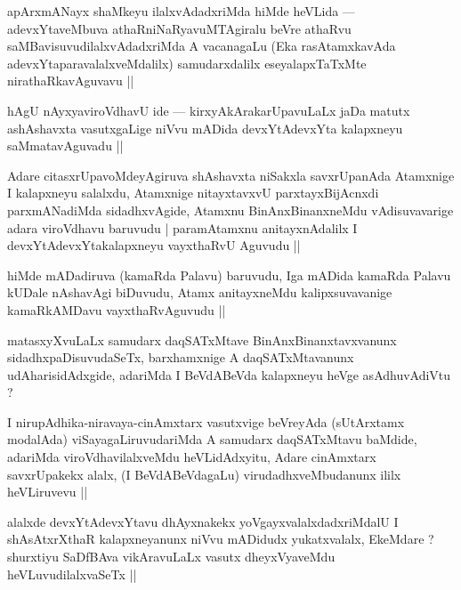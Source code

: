 
\begin{artha}
apArxmANayx shaMkeyu ilalxvAdadxriMda hiMde heVLida --- adevxYtaveMbuva athaRniNaRyavuMTAgiralu beVre athaRvu saMBavisuvudilalxvAdadxriMda A vacanagaLu (Eka rasAtamxkavAda adevxYtaparavalalxveMdalilx) samudarxdalilx eseyalapxTaTxMte nirathaRkavAguvavu ||
\end{artha}

\begin{artha}
hAgU nAyxyaviroVdhavU ide --- kirxyAkArakarUpavuLaLx jaDa matutx ashAshavxta vasutxgaLige niVvu mADida devxYtAdevxYta kalapxneyu saMmatavAguvadu ||
\end{artha}

\begin{artha}
Adare citasxrUpavoMdeyAgiruva shAshavxta niSakxla savxrUpanAda Atamxnige I kalapxneyu salalxdu, Atamxnige nitayxtavxvU parxtayxBijAcnxdi parxmANadiMda sidadhxvAgide, Atamxnu BinAnxBinanxneMdu vAdisuvavarige adara viroVdhavu baruvudu | paramAtamxnu anitayxnAdalilx I devxYtAdevxYtakalapxneyu vayxthaRvU Aguvudu ||
\end{artha}


\begin{artha}
hiMde mADadiruva (kamaRda Palavu) baruvudu, Iga mADida kamaRda Palavu kUDale nAshavAgi biDuvudu, Atamx anitayxneMdu kalipxsuvavanige kamaRkAMDavu vayxthaRvAguvudu ||
\end{artha}


\begin{artha}
matasxyXvuLaLx samudarx daqSATxMtave BinAnxBinanxtavxvanunx sidadhxpaDisuvudaSeTx, barxhamxnige A daqSATxMtavanunx udAharisidAdxgide, adariMda I BeVdABeVda kalapxneyu heVge asAdhuvAdiVtu ?
\end{artha}


\begin{artha}
I nirupAdhika-niravaya-cinAmxtarx vasutxvige beVreyAda (sUtArxtamx modalAda) viSayagaLiruvudariMda A samudarx daqSATxMtavu baMdide, adariMda viroVdhavilalxveMdu heVLidAdxyitu, Adare cinAmxtarx savxrUpakekx alalx, (I BeVdABeVdagaLu) virudadhxveMbudanunx ililx heVLiruvevu ||
\end{artha}

\begin{artha}
alalxde devxYtAdevxYtavu dhAyxnakekx yoVgayxvalalxdadxriMdalU I shAsAtxrXthaR kalapxneyanunx niVvu mADidudx yukatxvalalx, EkeMdare ? shurxtiyu SaDfBAva vikAravuLaLx vasutx dheyxVyaveMdu heVLuvudilalxvaSeTx ||
\end{artha}

